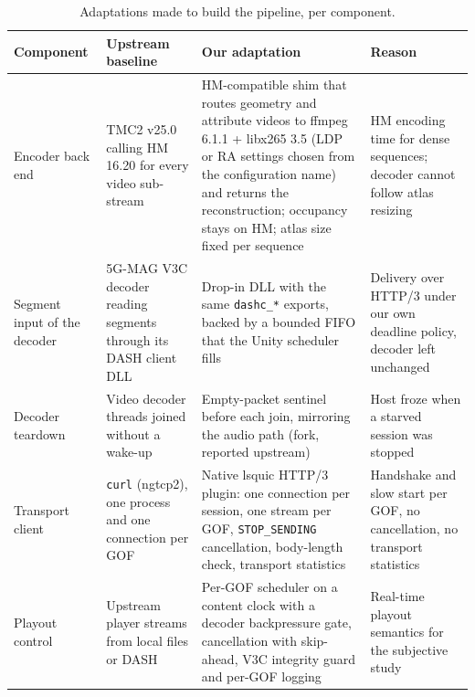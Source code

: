 \begin{table}[t]
  \caption{Adaptations made to build the pipeline, per component.}
  \label{tab:adaptations}
  \small
  \setlength{\tabcolsep}{4pt}
  \renewcommand{\arraystretch}{1.12}
  \begin{tabularx}{\textwidth}{@{}>{\raggedright\arraybackslash}p{2.1cm}
                                  >{\raggedright\arraybackslash}p{2.9cm}
                                  >{\raggedright\arraybackslash}X
                                  >{\raggedright\arraybackslash}p{3.2cm}@{}}
    \toprule
    \textbf{Component} & \textbf{Upstream baseline} & \textbf{Our adaptation} & \textbf{Reason} \\
    \midrule
    Encoder back end
      & TMC2 v25.0 calling HM 16.20 for every video sub-stream
      & HM-compatible shim that routes geometry and attribute videos to ffmpeg 6.1.1 + libx265 3.5 (LDP or RA settings chosen from the configuration name) and returns the reconstruction; occupancy stays on HM; atlas size fixed per sequence
      & HM encoding time for dense sequences; decoder cannot follow atlas resizing \\
    Segment input of the decoder
      & 5G-MAG V3C decoder reading segments through its DASH client DLL
      & Drop-in DLL with the same \texttt{dashc\_*} exports, backed by a bounded FIFO that the Unity scheduler fills
      & Delivery over HTTP/3 under our own deadline policy, decoder left unchanged \\
    Decoder teardown
      & Video decoder threads joined without a wake-up
      & Empty-packet sentinel before each join, mirroring the audio path (fork, reported upstream)
      & Host froze when a starved session was stopped \\
    Transport client
      & \texttt{curl} (ngtcp2), one process and one connection per GOF
      & Native lsquic HTTP/3 plugin: one connection per session, one stream per GOF, \texttt{STOP\_SENDING} cancellation, body-length check, transport statistics
      & Handshake and slow start per GOF, no cancellation, no transport statistics \\
    Playout control
      & Upstream player streams from local files or DASH
      & Per-GOF scheduler on a content clock with a decoder backpressure gate, cancellation with skip-ahead, V3C integrity guard and per-GOF logging
      & Real-time playout semantics for the subjective study \\

\end{tabularx}
\end{table}
